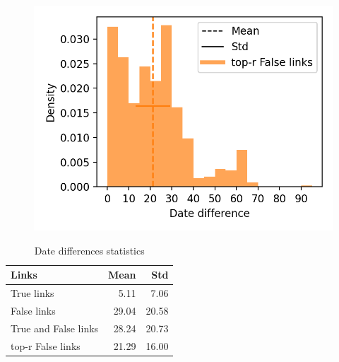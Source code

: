 \begin{figure}
  \label{fig:dates_differences_r_false}
  \includegraphics[width=\linewidth]{img/dates_differences_r_false.png}
\end{figure}

\begin{table}
  \centering
  \caption{Date differences statistics}
  \label{tab:date_differences}
    \begin{tabular}{l r r}
      \toprule
      Links                & Mean  & Std   \\
      \midrule
      True links           &  5.11 &  7.06 \\
      False links          & 29.04 & 20.58 \\
      True and False links & 28.24 & 20.73 \\
      top-r False links    & 21.29 & 16.00 \\
      \bottomrule
    \end{tabular}
\end{table}
